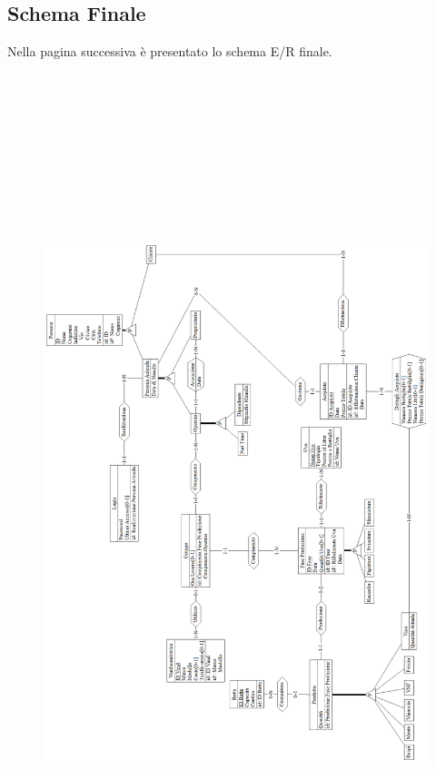 \documentclass{article}
\begin{document}
\subsection{Schema Finale}
Nella pagina successiva è presentato lo schema E/R finale.
\begin{figure}[htbp]
\centering
\includegraphics[height=25cm,width=1\textwidth]{img/Schema_Finale}
\end{figure}
\newpage
\end{document}
